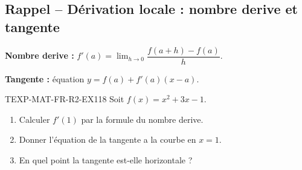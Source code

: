 

\subsection*{Rappel -- Dérivation locale : nombre derive et tangente}

\textbf{Nombre derive :} $f'(a) = \lim_{h \to 0} \dfrac{f(a+h) - f(a)}{h}$.

\textbf{Tangente :} équation $y = f(a) + f'(a)(x - a)$.

\begin{exercice}{TEXP-MAT-FR-R2-EX1}{1}{8}
Soit $f(x) = x^2 + 3x - 1$.
\begin{enumerate}
  \item Calculer $f'(1)$ par la formule du nombre derive.
  \item Donner l'équation de la tangente a la courbe en $x = 1$.
  \item En quel point la tangente est-elle horizontale ?
\end{enumerate}
\end{exercice}

